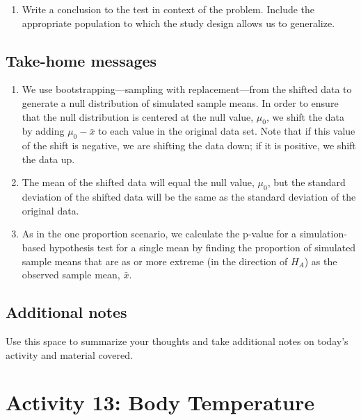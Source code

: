 \documentclass[
]{report}
\providecommand{\tightlist}{%
  \setlength{\itemsep}{0pt}\setlength{\parskip}{0pt}}
\begin{document}
\vspace{1in}

\begin{enumerate}
\def\labelenumi{\arabic{enumi}.}
\setcounter{enumi}{10}
\tightlist
\item
  Write a conclusion to the test in context of the problem. Include the appropriate population to which the study design allows us to generalize.
\end{enumerate}

\vspace{1in}

\subsection{Take-home messages}\label{take-home-messages-1}

\begin{enumerate}
\def\labelenumi{\arabic{enumi}.}
\item
  We use bootstrapping---sampling with replacement---from the shifted data to generate a null distribution of simulated sample means. In order to ensure that the null distribution is centered at the null value, \(\mu_0\), we shift the data by adding \(\mu_0 - \bar{x}\) to each value in the original data set. Note that if this value of the shift is negative, we are shifting the data down; if it is positive, we shift the data up.
\item
  The mean of the shifted data will equal the null value, \(\mu_0\), but the standard deviation of the shifted data will be the same as the standard deviation of the original data.
\item
  As in the one proportion scenario, we calculate the p-value for a simulation-based hypothesis test for a single mean by finding the proportion of simulated sample means that are as or more extreme (in the direction of \(H_A\)) as the observed sample mean, \(\bar{x}\).
\end{enumerate}

\subsection{Additional notes}\label{additional-notes-1}

Use this space to summarize your thoughts and take additional notes on today's activity and material covered.

\newpage

\section{Activity 13: Body Temperature}\label{activity-13-body-temperature}
\end{document}

